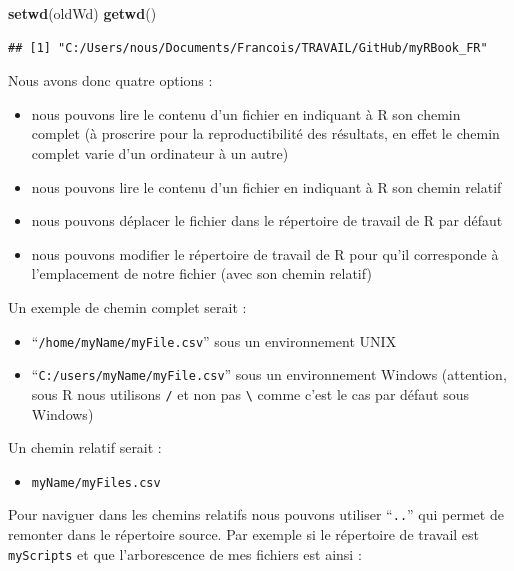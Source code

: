 \documentclass[
]{book}
\newenvironment{Shaded}{\begin{snugshade}}{\end{snugshade}}
\newcommand{\KeywordTok}[1]{\textcolor[rgb]{0.13,0.29,0.53}{\textbf{#1}}}
\newcommand{\NormalTok}[1]{#1}
\providecommand{\tightlist}{%
  \setlength{\itemsep}{0pt}\setlength{\parskip}{0pt}}
\begin{document}
\begin{Shaded}
\begin{Highlighting}[]
\KeywordTok{setwd}\NormalTok{(oldWd)}
\KeywordTok{getwd}\NormalTok{()}
\end{Highlighting}
\end{Shaded}

\begin{verbatim}
## [1] "C:/Users/nous/Documents/Francois/TRAVAIL/GitHub/myRBook_FR"
\end{verbatim}

Nous avons donc quatre options :

\begin{itemize}
\tightlist
\item
  nous pouvons lire le contenu d'un fichier en indiquant à R son chemin complet (à proscrire pour la reproductibilité des résultats, en effet le chemin complet varie d'un ordinateur à un autre)
\item
  nous pouvons lire le contenu d'un fichier en indiquant à R son chemin relatif
\item
  nous pouvons déplacer le fichier dans le répertoire de travail de R par défaut
\item
  nous pouvons modifier le répertoire de travail de R pour qu'il corresponde à l'emplacement de notre fichier (avec son chemin relatif)
\end{itemize}

Un exemple de chemin complet serait :

\begin{itemize}
\tightlist
\item
  ``\texttt{/home/myName/myFile.csv}'' sous un environnement UNIX
\item
  ``\texttt{C:/users/myName/myFile.csv}'' sous un environnement Windows (attention, sous R nous utilisons \texttt{/} et non pas \texttt{\textbackslash{}} comme c'est le cas par défaut sous Windows)
\end{itemize}

Un chemin relatif serait :

\begin{itemize}
\tightlist
\item
  \texttt{myName/myFiles.csv}
\end{itemize}

Pour naviguer dans les chemins relatifs nous pouvons utiliser ``\texttt{..}'' qui permet de remonter dans le répertoire source. Par exemple si le répertoire de travail est \texttt{myScripts} et que l'arborescence de mes fichiers est ainsi :
\end{document}

